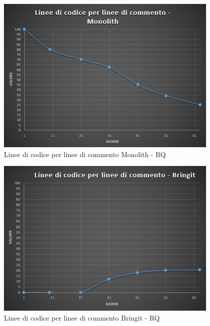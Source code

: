 \begin{figure}[H]
	\centering 
	\includegraphics[scale=0.8]{Sezioni/Immagini/LineeCodiceCommentoSDK-RQ}
	\caption{Linee di codice per linee di commento Monolith - RQ}
\end{figure}

\begin{figure}[H]
	\centering 
	\includegraphics[scale=0.8]{Sezioni/Immagini/LineeCodiceCommentoApp-RQ}
	\caption{Linee di codice per linee di commento Bringit - RQ}
\end{figure}


